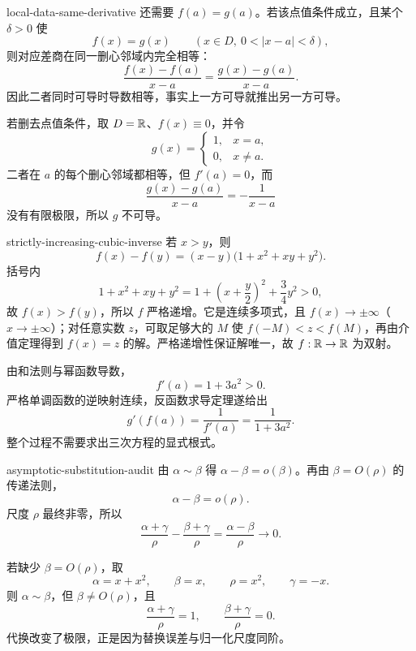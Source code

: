 \begin{solution}{local-data-same-derivative}
还需要 \(f(a)=g(a)\)。若该点值条件成立，且某个 \(\delta>0\) 使
\[
 f(x)=g(x)\qquad
 (x\in D,\ 0<|x-a|<\delta),
\]
则对应差商在同一删心邻域内完全相等：
\[
 \frac{f(x)-f(a)}{x-a}
 =\frac{g(x)-g(a)}{x-a}.
\]
因此二者同时可导时导数相等，事实上一方可导就推出另一方可导。

若删去点值条件，取 \(D=\mathbb{R}\)、\(f(x)\equiv0\)，并令
\[
 g(x)=
 \begin{cases}
  1,&x=a,\\
  0,&x\ne a.
 \end{cases}
\]
二者在 \(a\) 的每个删心邻域都相等，但 \(f'(a)=0\)，而
\[
 \frac{g(x)-g(a)}{x-a}=-\frac1{x-a}
\]
没有有限极限，所以 \(g\) 不可导。
\end{solution}

\begin{solution}{strictly-increasing-cubic-inverse}
若 \(x>y\)，则
\[
 f(x)-f(y)
 =(x-y)\bigl(1+x^2+xy+y^2\bigr).
\]
括号内
\[
 1+x^2+xy+y^2
 =1+\left(x+\frac y2\right)^2+\frac34y^2>0,
\]
故 \(f(x)>f(y)\)，所以 \(f\) 严格递增。它是连续多项式，且 \(f(x)\to\pm\infty\)（\(x\to\pm\infty\)）；对任意实数 \(z\)，可取足够大的 \(M\) 使 \(f(-M)<z<f(M)\)，再由介值定理得到 \(f(x)=z\) 的解。严格递增性保证解唯一，故 \(f:\mathbb{R}\to\mathbb{R}\) 为双射。

由和法则与幂函数导数，
\[
 f'(a)=1+3a^2>0.
\]
严格单调函数的逆映射连续，反函数求导定理遂给出
\[
 g'(f(a))=\frac1{f'(a)}
 =\frac1{1+3a^2}.
\]
整个过程不需要求出三次方程的显式根式。
\end{solution}

\begin{solution}{asymptotic-substitution-audit}
由 \(\alpha\sim\beta\) 得 \(\alpha-\beta=o(\beta)\)。再由 \(\beta=O(\rho)\) 的传递法则，
\[
 \alpha-\beta=o(\rho).
\]
尺度 \(\rho\) 最终非零，所以
\[
 \frac{\alpha+\gamma}{\rho}
 -\frac{\beta+\gamma}{\rho}
 =\frac{\alpha-\beta}{\rho}\longrightarrow0.
\]

若缺少 \(\beta=O(\rho)\)，取
\[
 \alpha=x+x^2,\qquad\beta=x,\qquad
 \rho=x^2,\qquad\gamma=-x.
\]
则 \(\alpha\sim\beta\)，但 \(\beta\ne O(\rho)\)，且
\[
 \frac{\alpha+\gamma}{\rho}=1,\qquad
 \frac{\beta+\gamma}{\rho}=0.
\]
代换改变了极限，正是因为替换误差与归一化尺度同阶。
\end{solution}
